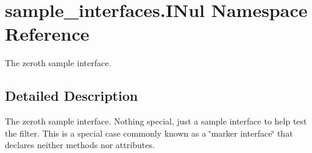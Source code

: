\hypertarget{namespacesample__interfaces_1_1_i_nul}{\section{sample\-\_\-interfaces.\-I\-Nul Namespace Reference}
\label{namespacesample__interfaces_1_1_i_nul}
}


The zeroth sample interface.  




\subsection{Detailed Description}
The zeroth sample interface. Nothing special, just a sample interface to help test the filter. This is a special case commonly known as a \char`\"{}marker
    interface\char`\"{} that declares neither methods nor attributes. 